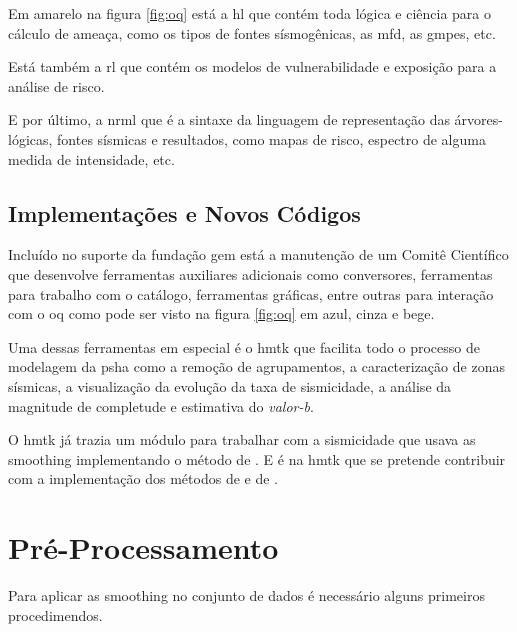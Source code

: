 Em amarelo na figura \ref{fig:oq} está a \gls{hl} que contém toda lógica e ciência para o cálculo de ameaça,
como os tipos de fontes sísmogênicas, as \gls{mfd}, as \glspl{gmpe}, etc. 

Está também a \gls{rl}
que contém os modelos de vulnerabilidade e exposição para a análise de risco. 

E por último,
a \gls{nrml} que é a sintaxe da linguagem de representação das árvores-lógicas, fontes sísmicas e
resultados, como mapas de risco, espectro de alguma medida de intensidade, etc. 


\subsection{Implementações e Novos Códigos}
\label{sec:implementacao}

Incluído no suporte da fundação \gls{gem} está a manutenção de um Comitê Científico
que desenvolve ferramentas auxiliares adicionais como conversores, ferramentas para trabalho com 
o catálogo, ferramentas gráficas, entre outras para interação com o
\gls{oq} como pode ser visto na figura \ref{fig:oq} em azul, cinza e bege.

Uma dessas ferramentas em especial é o \gls{hmtk} \citep{weatherill_2012, weatherill_2014-1} que facilita todo o
processo de modelagem da \gls{psha} como a remoção de agrupamentos, a caracterização de zonas sísmicas,  
a visualização da evolução da taxa de sismicidade, a análise da magnitude de completude e
estimativa do \emph{valor-b}.

O \gls{hmtk} já trazia um módulo para trabalhar com a sismicidade que usava as \gls{smoothing}
implementando o método de \citet{frankel_1995}. E é na \gls{hmtk} que se pretende
contribuir com a implementação dos métodos de \citet{woo_1996} e de \citet{helmstetter_2012}.
 
\section{Pré-Processamento}
\label{sec:pre_processamento}

Para aplicar as \gls{smoothing} no conjunto de dados é necessário alguns primeiros procedimendos.

